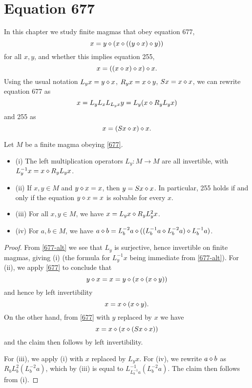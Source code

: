 \chapter{Equation 677}\label{677-chapter}

In this chapter we study finite magmas that obey equation 677,
\begin{equation}\label{677}
  x = y \diamond (x \diamond ((y \diamond x) \diamond y))
\end{equation}
for all $x,y$, and whether this implies equation 255,
\begin{equation}\label{255}
  x = ((x \diamond x) \diamond x) \diamond x.
\end{equation}
Using the usual notation $L_y x = y \diamond x$, $R_y x = x \diamond y$, $Sx = x \diamond x$, we can rewrite equation 677 as
\begin{equation}\label{677-alt}
  x = L_y L_x L_{L_y x} y = L_y (x \diamond R_y L_y x)
\end{equation}
and 255 as
$$ x = (Sx \diamond x) \diamond x.$$

\begin{lemma}\label{677-basic} Let $M$ be a finite magma obeying \eqref{677}.
  \begin{itemize}
  \item (i)  The left multiplication operators $L_y: M \to M$ are all invertible, with $L_y^{-1} x = x \diamond R_y L_y x$.
  \item (ii) If $x,y \in M$ and $y \diamond x = x$, then $y = Sx \diamond x$.  In particular, 255 holds if and only if the equation $y \diamond x = x$ is solvable for every $x$.
  \item (iii)  For all $x,y \in M$, we have $x = L_y x \diamond R_y L_y^2 x$.
  \item (iv) For $a,b \in M$, we have $a \diamond b = L_b^{-2} a \diamond ((L_b^{-1} a \diamond L_b^{-2} a) \diamond L_b^{-1} a)$.
\end{itemize}
\end{lemma}

\begin{proof}  From \eqref{677-alt} we see that $L_y$ is surjective, hence invertible on finite magmas, giving (i) (the formula for $L_y^{-1} x$ being immediate from \eqref{677-alt}).  For (ii), we apply \eqref{677} to conclude that
  $$ y \diamond x = x = y \diamond (x \diamond (x \diamond y))$$
  and hence by left invertibility
  $$ x = x \diamond (x \diamond y).$$
  On the other hand, from \eqref{677} with $y$ replaced by $x$ we have
  $$ x = x \diamond (x \diamond (Sx \diamond x))$$
  and the claim then follows by left invertibility.

  For (iii), we apply (i) with $x$ replaced by $L_y x$.  For (iv), we rewrite $a \diamond b$ as $R_b L_b^2 (L_b^{-2} a)$, which by (iii) is equal to $L_{L_b^{-1} a}^{-1} (L_b^{-2} a)$.  The claim then follows from (i).
\end{proof}

